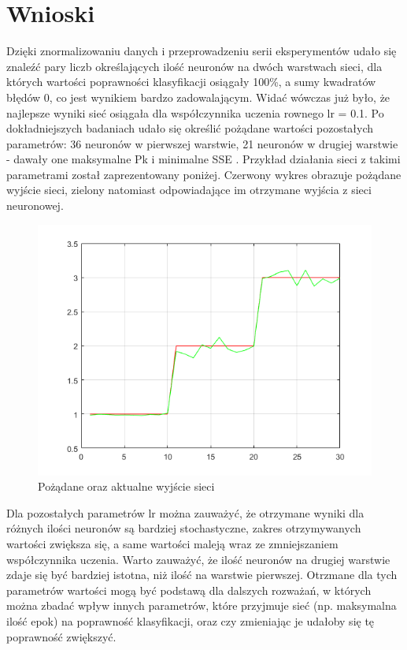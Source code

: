 \documentclass[a4paper, 12pt]{report}
\begin{document}
\chapter{Wnioski}
Dzięki znormalizowaniu danych i przeprowadzeniu serii eksperymentów udało się znaleźć pary liczb określających ilość neuronów na dwóch warstwach sieci, dla których wartości poprawności klasyfikacji osiągały 100\%, a sumy kwadratów błędów 0, co jest wynikiem bardzo zadowalającym. Widać wówczas już było, że najlepsze wyniki sieć osiągała dla współczynnika uczenia rownego lr = 0.1. Po dokładniejszych badaniach udało się określić pożądane wartości pozostałych parametrów: 36 neuronów w pierwszej warstwie, 21 neuronów w drugiej warstwie - dawały one maksymalne Pk i minimalne SSE . Przykład działania sieci z takimi parametrami został zaprezentowany poniżej. Czerwony wykres obrazuje pożądane wyjście sieci, zielony natomiast odpowiadające im otrzymane wyjścia z sieci neuronowej.

\begin{figure}[hbt!]
\includegraphics[width=14cm]{zielony}
\centering
\caption{Pożądane oraz aktualne wyjście sieci }
\end{figure}

Dla pozostałych parametrów lr można zauważyć, że otrzymane wyniki dla różnych ilości neuronów są bardziej stochastyczne, zakres otrzymywanych wartości zwiększa się, a same wartości maleją wraz ze zmniejszaniem współczynnika uczenia. Warto zauważyć, że ilość neuronów na drugiej warstwie zdaje się być bardziej istotna, niż ilość na warstwie pierwszej. Otrzmane dla tych parametrów wartości mogą być podstawą dla dalszych rozważań, w których można zbadać wpływ innych parametrów, które przyjmuje sieć (np. maksymalna ilość epok) na poprawność klasyfikacji, oraz czy zmieniając je udałoby się tę poprawność zwiększyć.\\
\end{document}
